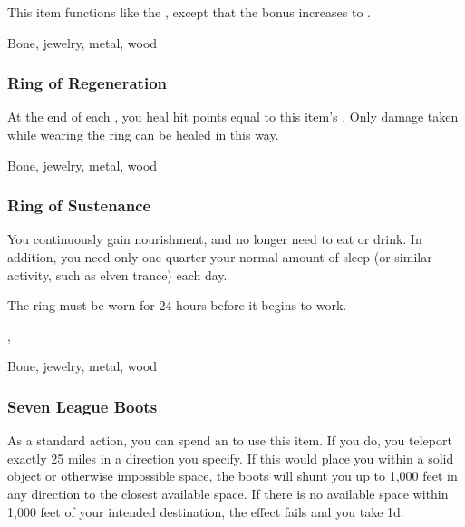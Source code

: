 This item functions like the , except that the bonus increases to .



 


 Bone, jewelry, metal, wood


\lowercase{\hypertarget{item:Ring of Regeneration}{}}\label{item:Ring of Regeneration}
\hypertarget{item:Ring of Regeneration}{\subsubsection{Ring of Regeneration\hfill{}}}

At the end of each , you heal hit points equal to this item's .
Only damage taken while wearing the ring can be healed in this way.



 


 Bone, jewelry, metal, wood


\lowercase{\hypertarget{item:Ring of Sustenance}{}}\label{item:Ring of Sustenance}
\hypertarget{item:Ring of Sustenance}{\subsubsection{Ring of Sustenance\hfill{}}}

You continuously gain nourishment, and no longer need to eat or drink.
In addition, you need only one-quarter your normal amount of sleep (or similar activity, such as elven trance) each day.

The ring must be worn for 24 hours before it begins to work.



 , 


 Bone, jewelry, metal, wood


\lowercase{\hypertarget{item:Seven League Boots}{}}\label{item:Seven League Boots}
\hypertarget{item:Seven League Boots}{\subsubsection{Seven League Boots\hfill{}}}

As a standard action, you can spend an  to use this item.
If you do, you teleport exactly 25 miles in a direction you specify.
If this would place you within a solid object or otherwise impossible space, the boots will shunt you up to 1,000 feet in any direction to the closest available space.
If there is no available space within 1,000 feet of your intended destination, the effect fails and you take  \minus1d.



